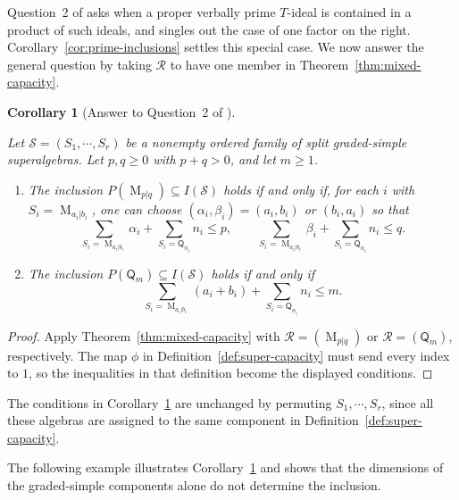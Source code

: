 \documentclass[11pt,reqno]{amsart}
\newcommand{\Mat}{\operatorname{M}}
\newcommand{\Qtype}{\mathsf Q}
\newtheorem{corollary}[theorem]{Corollary}
\theoremstyle{definition}
\theoremstyle{remark}
\numberwithin{equation}{section}
\begin{document}
Question~2 of \cite{Berele2012} asks when a proper
verbally prime $T$-ideal is contained in a product
of such ideals, and singles out the case of one
factor on the right.
Corollary~\ref{cor:prime-inclusions} settles this
special case.
We now answer the general question by taking
$\mathcal R$ to have one member in
Theorem~\ref{thm:mixed-capacity}.

\begin{corollary}[Answer to Question~2 of \cite{Berele2012}]
\label{cor:question-two}

Let $\mathcal S=(S_1,\cdots,S_r)$ be a nonempty ordered
family of split graded-simple superalgebras.
Let $p,q\geq0$ with $p+q>0$, and let $m\geq1$.
\begin{enumerate}
\item
The inclusion
$P(\Mat_{p|q})\subseteq I(\mathcal S)$
holds if and only if, for each $i$ with
$S_i=\Mat_{a_i|b_i}$, one can choose
$(\alpha_i,\beta_i)=(a_i,b_i)$ or $(b_i,a_i)$
so that
\[
\sum_{S_i=\Mat_{a_i|b_i}}\alpha_i
+\sum_{S_i=\Qtype_{n_i}}n_i\leq p,
\qquad
\sum_{S_i=\Mat_{a_i|b_i}}\beta_i
+\sum_{S_i=\Qtype_{n_i}}n_i\leq q.
\]

\item
The inclusion
$P(\Qtype_m)\subseteq I(\mathcal S)$
holds if and only if
\[
\sum_{S_i=\Mat_{a_i|b_i}}(a_i+b_i)
+\sum_{S_i=\Qtype_{n_i}}n_i\leq m.
\]
\end{enumerate}
\end{corollary}

\begin{proof}
Apply Theorem~\ref{thm:mixed-capacity} with
$\mathcal R=(\Mat_{p|q})$ or $\mathcal R=(\Qtype_m)$,
respectively.
The map $\phi$ in Definition~\ref{def:super-capacity}
must send every index to $1$, so the inequalities
in that definition become the displayed conditions.
\end{proof}

The conditions in Corollary~\ref{cor:question-two}
are unchanged by permuting $S_1,\cdots,S_r$,
since all these algebras are assigned to the same
component in Definition~\ref{def:super-capacity}.

The following example illustrates
Corollary~\ref{cor:question-two} and shows that the
dimensions of the graded-simple components alone
do not determine the inclusion.
\end{document}
